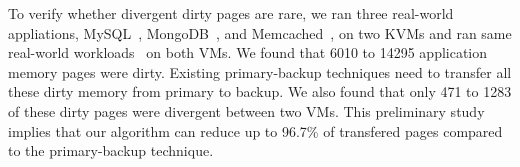 To verify whether divergent dirty pages are rare, we ran three real-world 
appliations, MySQL~\cite{mysql}, MongoDB~\cite{mongodb}, and 
Memcached~\cite{memcached}, on two KVMs and ran same real-world 
workloads~\cite{sysbench} on both VMs. We found that 6010 to 14295 application 
memory pages were dirty. Existing primary-backup techniques need to transfer all 
these dirty memory from primary to backup. We also found that only 471 to 1283 
of these dirty pages were divergent between two VMs. This preliminary study 
implies that our algorithm can reduce up to 96.7\% of transfered pages compared 
to the primary-backup technique.





